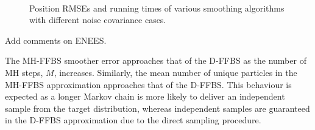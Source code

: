 \documentclass[10pt,twocolumn,twoside]{IEEEtran}
\begin{document}
\begin{figure}[!t]
\centering
{}
\\
\caption{Position RMSEs and running times of various smoothing algorithms with different noise covariance cases.}%
\label{fig:rmse_vs_time}%
\end{figure}

{\meta Add comments on ENEES.}

The MH-FFBS smoother error approaches that of the D-FFBS as the number of MH steps, $M$, increases. Similarly, the mean number of unique particles in the MH-FFBS approximation approaches that of the D-FFBS. This behaviour is expected as a longer Markov chain is more likely to deliver an independent sample from the target distribution, whereas independent samples are guaranteed in the D-FFBS approximation due to the direct sampling procedure.
\end{document}

